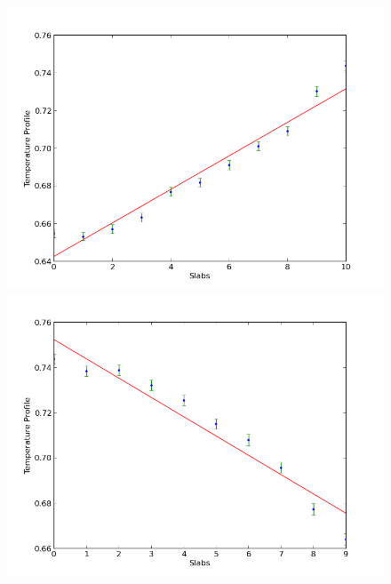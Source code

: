 \documentclass[12pt,a4paper]{article}
\begin{document}
\section{}
\begin{figure}[!htb]
  \includegraphics[width=\linewidth]{1.png}
\endminipage\hfill
{}
  \includegraphics[width=\linewidth]{2.png}
\endminipage\hfill
\end{figure}
\end{document}
